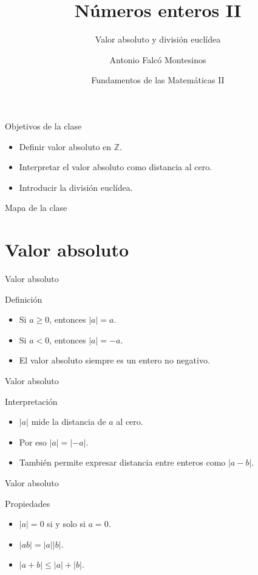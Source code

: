 \documentclass[aspectratio=169,11pt]{beamer}
\title[FdM II -- Clase 02]{Números enteros II}
\subtitle{Valor absoluto y división euclídea}
\author{Antonio Falcó Montesinos}
\institute{Universidad CEU Cardenal Herrera}
\date{Fundamentos de las Matemáticas II}
\begin{document}
\begin{frame}
  \titlepage
\end{frame}

\begin{frame}{Objetivos de la clase}
\begin{itemize}
  \item Definir valor absoluto en \(\mathbb{Z}\).
  \item Interpretar el valor absoluto como distancia al cero.
  \item Introducir la división euclídea.
\end{itemize}
\end{frame}

\begin{frame}{Mapa de la clase}
\tableofcontents
\end{frame}

\section{Valor absoluto}

\begin{frame}{Valor absoluto}
\begin{block}{Definición}
\begin{itemize}
  \item Si \(a\geq 0\), entonces \(|a|=a\).
  \item Si \(a<0\), entonces \(|a|=-a\).
  \item El valor absoluto siempre es un entero no negativo.
\end{itemize}
\end{block}
\end{frame}

\begin{frame}{Valor absoluto}
\begin{block}{Interpretación}
\begin{itemize}
  \item \(|a|\) mide la distancia de \(a\) al cero.
  \item Por eso \(|a|=|-a|\).
  \item También permite expresar distancia entre enteros como \(|a-b|\).
\end{itemize}
\end{block}
\end{frame}

\begin{frame}{Valor absoluto}
\begin{block}{Propiedades}
\begin{itemize}
  \item \(|a|=0\) si y solo si \(a=0\).
  \item \(|ab|=|a||b|\).
  \item \(|a+b|\leq |a|+|b|\).
\end{itemize}
\end{block}
\end{frame}
\end{document}
